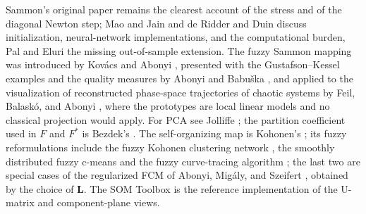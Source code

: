 Sammon's original paper \cite{sammon:1969} remains the clearest account of the stress and of the diagonal Newton step; Mao and Jain \cite{mao:1995} and de Ridder and Duin \cite{deridder:1997} discuss initialization, neural-network implementations, and the computational burden, Pal and Eluri \cite{pal:1998} the missing out-of-sample extension. The fuzzy Sammon mapping was introduced by Kov\'acs and Abonyi \cite{kovacs:2002:fuzzsam}, presented with the Gustafson--Kessel examples and the quality measures by Abonyi and Babu\v{s}ka \cite{abonyi:2004:fuzzsam}, and applied to the visualization of reconstructed phase-space trajectories of chaotic systems by Feil, Balask\'o, and Abonyi \cite{feil:2007:fuzzsam}, where the prototypes are local linear models and no classical projection would apply. For PCA see Jolliffe \cite{jolliffe:2002}; the partition coefficient used in $F$ and $F^*$ is Bezdek's \cite{bezdek:1981}. The self-organizing map is Kohonen's \cite{kohonen:1990}; its fuzzy reformulations include the fuzzy Kohonen clustering network \cite{tsao:1994:fkcn}, the smoothly distributed fuzzy c-means \cite{pascualmarqui:2001} and the fuzzy curve-tracing algorithm \cite{yan:2001:curvetrace}; the last two are special cases of the regularized FCM of Abonyi, Mig\'aly, and Szeifert \cite{migaly:2003:fsom}, obtained by the choice of $\mathbf{L}$. The SOM Toolbox \cite{vesanto:2000:somtoolbox} is the reference implementation of the U-matrix and component-plane views.
